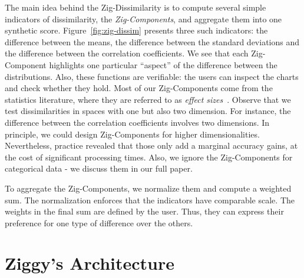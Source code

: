 The main idea behind the Zig-Dissimilarity is to  compute several simple
indicators of dissimilarity, the \emph{Zig-Components}, and aggregate them into
one synthetic score.  Figure~\ref{fig:zig-dissim} presents three such
indicators: the difference between the means, the difference between the
standard deviations and the difference between the correlation coefficients. We
see that each Zig-Component highlights one particular ``aspect'' of the
difference between the distributions.  Also, these functions are verifiable:
the users can inspect the charts and check whether they hold.  Most of our
Zig-Components come from the statistics literature, where they are referred to
as \emph{effect sizes}~\cite{hedges2014statistical}. Observe that we test
dissimilarities in spaces with one but also two dimension. For instance, the
difference between the correlation coefficients involves two dimensions. In
principle, we could design Zig-Components for higher dimensionalities.
Nevertheless, practice revealed that those only add a marginal accuracy gains,
at the cost of significant processing times. Also, we ignore the Zig-Components
for categorical data - we discuss them in our full paper.

To aggregate the Zig-Components, we normalize them and compute a weighted sum.
The normalization enforces that the indicators have comparable scale. The
weights in the final sum are defined by the user. Thus, they can express their
preference for one type of difference over the others. 

\section{Ziggy's Architecture}
\label{sec:solution}

